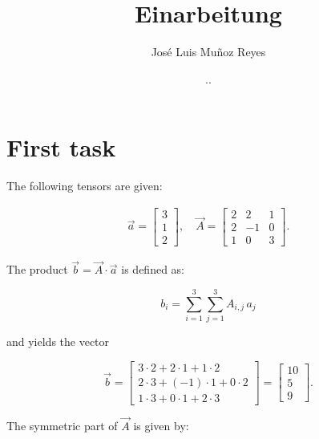 \documentclass[12pt,bibstyle=none,pagenumberinfooter]{ifmdocument}
\author{José Luis Muñoz Reyes}
\title{Einarbeitung}
\date{\the\day.\the\month.\the\year}
\begin{document}
\maketitle
\section{First task}

The following tensors are given:

\begin{gather}
    \vec{a} = \begin{bmatrix}
        3 \\ 1 \\ 2
    \end{bmatrix}, \quad
    \vec{A} = \begin{bmatrix}
        2 & 2 & 1 \\ 2 & -1 & 0 \\ 1 & 0 & 3
    \end{bmatrix} .
\end{gather}

The product $\Vec{b} = \Vec{A}\cdot \Vec{a}$ is defined as:

\begin{equation}
    b_i = \sum\limits_{i=1}^3 \sum\limits_{j=1}^3  A_{i,j} \, a_j
\end{equation}

and yields the vector

\begin{equation}
    \Vec{b} = \begin{bmatrix}
        3\cdot 2 + 2\cdot1 + 1\cdot2 \\ 2\cdot3 + (-1)\cdot1 + 0\cdot2 \\ 1\cdot3 + 0\cdot1 + 2\cdot3
    \end{bmatrix}
    = \begin{bmatrix}
        10 \\ 5 \\ 9
    \end{bmatrix}.
\end{equation}

The symmetric part of $\vec{A}$ is given by:
\end{document}

